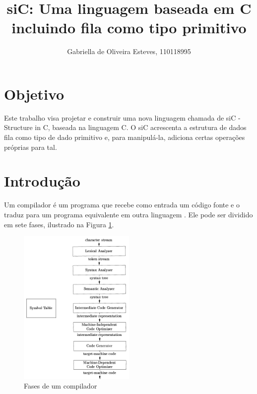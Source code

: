 \documentclass[12pt]{article}
\title{siC: Uma linguagem baseada em C incluindo fila como tipo primitivo}
\author{Gabriella de Oliveira Esteves, 110118995}
\begin{document}
 

\maketitle

\section{Objetivo}

Este trabalho visa projetar e construir uma nova linguagem chamada de siC - Structure in C, baseada na linguagem C. O siC acrescenta a estrutura de dados fila como tipo de dado primitivo e, para manipulá-la, adiciona certas operações próprias para tal.

\section{Introdução}

\indent Um compilador é um programa que recebe como entrada um código fonte e o traduz para um programa equivalente em outra linguagem \cite{book}. Ele pode ser dividido em sete fases, ilustrado na Figura \ref{fig:compilador}.

\begin{figure}[!ht]
  \centering
  \includegraphics[width=0.5\textwidth]{compilador.png}
  \caption{Fases de um compilador} \label{fig:compilador}
\end{figure}
\end{document}
